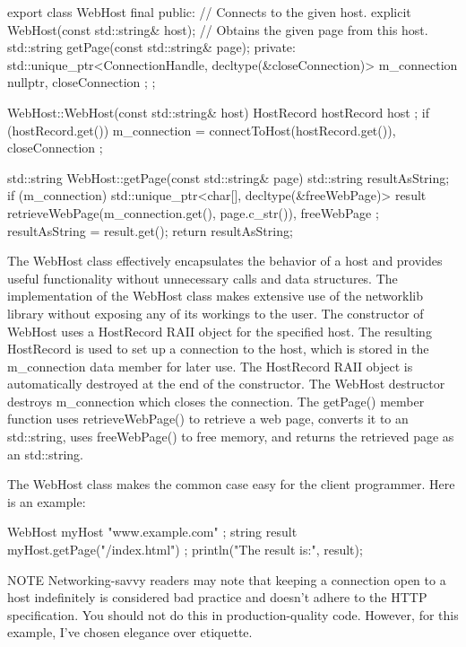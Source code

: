 \begin{cpp}
export class WebHost final
{
    public:
        // Connects to the given host.
        explicit WebHost(const std::string& host);
        // Obtains the given page from this host.
        std::string getPage(const std::string& page);
    private:
        std::unique_ptr<ConnectionHandle, decltype(&closeConnection)> m_connection
            { nullptr, closeConnection };
};

WebHost::WebHost(const std::string& host)
{
    HostRecord hostRecord { host };
    if (hostRecord.get()) {
        m_connection = { connectToHost(hostRecord.get()), closeConnection };
    }
}

std::string WebHost::getPage(const std::string& page)
{
    std::string resultAsString;
    if (m_connection) {
        std::unique_ptr<char[], decltype(&freeWebPage)> result {
            retrieveWebPage(m_connection.get(), page.c_str()),
            freeWebPage };
        resultAsString = result.get();
    }
    return resultAsString;
}
\end{cpp}

The WebHost class effectively encapsulates the behavior of a host and provides useful functionality without unnecessary calls and data structures. The implementation of the WebHost class makes extensive use of the networklib library without exposing any of its workings to the user. The constructor of WebHost uses a HostRecord RAII object for the specified host. The resulting HostRecord is used to set up a connection to the host, which is stored in the m\_connection data member for later use. The HostRecord RAII object is automatically destroyed at the end of the constructor. The WebHost destructor destroys m\_connection which closes the connection. The getPage() member function uses retrieveWebPage() to retrieve a web page, converts it to an std::string, uses freeWebPage() to free memory, and returns the retrieved page as an std::string.

The WebHost class makes the common case easy for the client programmer. Here is an example:

\begin{cpp}
WebHost myHost { "www.example.com" };
string result { myHost.getPage("/index.html") };
println("The result is:\n{}", result);
\end{cpp}

\begin{myNotic}{NOTE}
Networking-savvy readers may note that keeping a connection open to a host indefinitely is considered bad practice and doesn’t adhere to the HTTP specification. You should not do this in production-quality code. However, for this example, I’ve chosen elegance over etiquette.
\end{myNotic}

